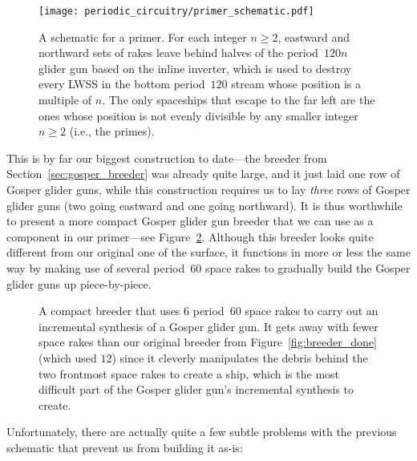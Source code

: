 \begin{figure}[!htb]
	\centering
	\texttt{[image: periodic\_circuitry/primer\_schematic.pdf]}
	\caption{A schematic for a primer. For each integer $n \geq 2$, eastward and northward sets of rakes leave behind halves of the period~$120n$ glider gun based on the inline inverter, which is used to destroy every LWSS in the bottom period~$120$ stream whose position is a multiple of $n$. The only spaceships that escape to the far left are the ones whose position is not evenly divisible by any smaller integer $n \geq 2$ (i.e., the primes).}
	\label{fig:primer_schematic}
\end{figure}

This is by far our biggest construction to date---the breeder from Section~\ref{sec:gosper_breeder} was already quite large, and it just laid one row of Gosper glider guns, while this construction requires us to lay \emph{three} rows of Gosper glider guns (two going eastward and one going northward). It is thus worthwhile to present a more compact Gosper glider gun breeder that we can use as a component in our primer---see Figure~\ref{fig:breeder_compact}. Although this breeder looks quite different from our original one of the surface, it functions in more or less the same way by making use of several period~$60$ space rakes to gradually build the Gosper glider guns up piece-by-piece.

\begin{figure}[!htb]
	\centering
	\caption{A compact breeder that uses $6$ period~$60$ space rakes to carry out an incremental synthesis of a Gosper glider gun. It gets away with fewer space rakes than our original breeder from Figure~\ref{fig:breeder_done} (which used $12$) since it cleverly manipulates the debris behind the two frontmost space rakes to create a ship, which is the most difficult part of the Gosper glider gun's incremental synthesis to create.}
	\label{fig:breeder_compact}
\end{figure}

Unfortunately, there are actually quite a few subtle problems with the previous schematic that prevent us from building it as-is:\smallskip

